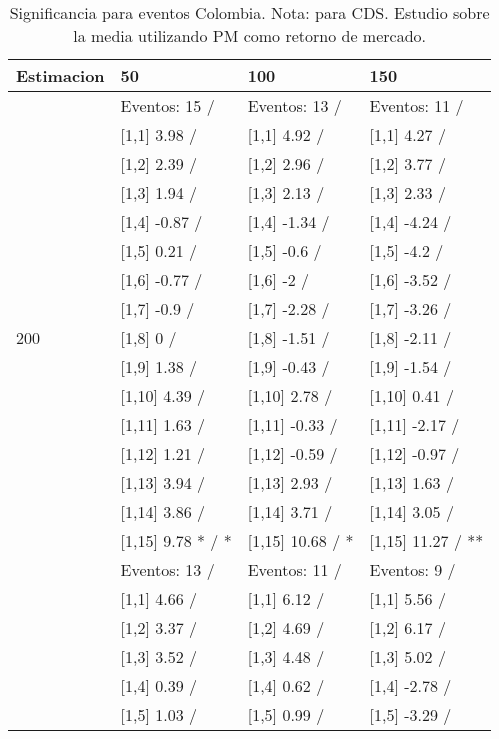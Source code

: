 \begin{table}

\caption{Significancia para eventos Colombia. Nota: para CDS. Estudio sobre la media utilizando PM como retorno de mercado.}
\centering
\begin{tabular}[t]{llll}
\toprule
Estimacion & 50 & 100 & 150\\
\midrule
 & Eventos:  15 / & Eventos:  13 / & Eventos:  11 /\\
 & {}[1,1] 3.98  / & {}[1,1] 4.92  / & {}[1,1] 4.27  /\\
 & {}[1,2] 2.39  / & {}[1,2] 2.96  / & {}[1,2] 3.77  /\\
 & {}[1,3] 1.94  / & {}[1,3] 2.13  / & {}[1,3] 2.33  /\\
 & {}[1,4] -0.87  / & {}[1,4] -1.34  / & {}[1,4] -4.24  /\\
\addlinespace
 & {}[1,5] 0.21  / & {}[1,5] -0.6  / & {}[1,5] -4.2  /\\
 & {}[1,6] -0.77  / & {}[1,6] -2  / & {}[1,6] -3.52  /\\
 & {}[1,7] -0.9  / & {}[1,7] -2.28  / & {}[1,7] -3.26  /\\
200 & {}[1,8] 0  / & {}[1,8] -1.51  / & {}[1,8] -2.11  /\\
 & {}[1,9] 1.38  / & {}[1,9] -0.43  / & {}[1,9] -1.54  /\\
\addlinespace
 & {}[1,10] 4.39  / & {}[1,10] 2.78  / & {}[1,10] 0.41  /\\
 & {}[1,11] 1.63  / & {}[1,11] -0.33  / & {}[1,11] -2.17  /\\
 & {}[1,12] 1.21  / & {}[1,12] -0.59  / & {}[1,12] -0.97  /\\
 & {}[1,13] 3.94  / & {}[1,13] 2.93  / & {}[1,13] 1.63  /\\
 & {}[1,14] 3.86  / & {}[1,14] 3.71  / & {}[1,14] 3.05  /\\
\addlinespace
 & {}[1,15] 9.78 * / * & {}[1,15] 10.68  / * & {}[1,15] 11.27  / **\\
 & Eventos:  13 / & Eventos:  11 / & Eventos:  9 /\\
 & {}[1,1] 4.66  / & {}[1,1] 6.12  / & {}[1,1] 5.56  /\\
 & {}[1,2] 3.37  / & {}[1,2] 4.69  / & {}[1,2] 6.17  /\\
 & {}[1,3] 3.52  / & {}[1,3] 4.48  / & {}[1,3] 5.02  /\\
\addlinespace
 & {}[1,4] 0.39  / & {}[1,4] 0.62  / & {}[1,4] -2.78  /\\
 & {}[1,5] 1.03  / & {}[1,5] 0.99  / & {}[1,5] -3.29  /\\

\end{tabular}
\end{table}
